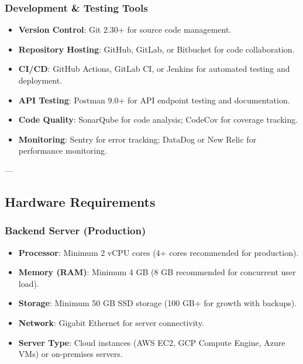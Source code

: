 \subsubsection{Development \& Testing Tools}
\begin{itemize}
    \item \textbf{Version Control}: Git 2.30+ for source code management.
    \item \textbf{Repository Hosting}: GitHub, GitLab, or Bitbucket for code collaboration.
    \item \textbf{CI/CD}: GitHub Actions, GitLab CI, or Jenkins for automated testing and deployment.
    \item \textbf{API Testing}: Postman 9.0+ for API endpoint testing and documentation.
    \item \textbf{Code Quality}: SonarQube for code analysis; CodeCov for coverage tracking.
    \item \textbf{Monitoring}: Sentry for error tracking; DataDog or New Relic for performance monitoring.
\end{itemize}

---

\subsection{Hardware Requirements}

\subsubsection{Backend Server (Production)}
\begin{itemize}
    \item \textbf{Processor}: Minimum 2 vCPU cores (4+ cores recommended for production).
    \item \textbf{Memory (RAM)}: Minimum 4 GB (8 GB recommended for concurrent user load).
    \item \textbf{Storage}: Minimum 50 GB SSD storage (100 GB+ for growth with backups).
    \item \textbf{Network}: Gigabit Ethernet for server connectivity.
    \item \textbf{Server Type}: Cloud instances (AWS EC2, GCP Compute Engine, Azure VMs) or on-premises servers.
\end{itemize}

